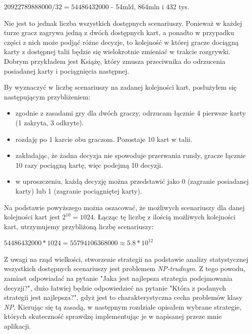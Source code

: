 \begin{center}
	$20 922 789 888 000 / 32 = 54486432000$ - 54mld, 864mln i 432 tys.
\end{center}

Nie jest to jednak liczba wszystkich dostępnych scenariuszy. Ponieważ w każdej turze gracz zagrywa jedną z dwóch dostępnych kart, a ponadto w przypadku części z nich może podjąć różne decyzje, to kolejność w której gracze dociągną karty z dostępnej talii będzie się wielokrotnie zmieniać w trakcie rozgrywki. Dobrym przykładem jest Książę, który zmusza przeciwnika do odrzucenia posiadanej karty i pociągnięcia następnej. 

By wyznaczyć w liczbę scenariuszy na zadanej kolejności kart, posłużyłem się następującym przybliżeniem:
\begin{itemize}
	\item zgodnie z zasadami gry dla dwóch graczy, odrzucam łącznie 4 pierwsze karty (1 zakryta, 3 odkryte).
	\item rozdaję po 1 karcie obu graczom. Pozostaje 10 kart w talii.
	\item zakładając, że żadna decyzja nie spowoduje przerwania rundy, gracze łącznie 10 razy pociągną kartę, więc podejmą 10 decyzji.
	\item w uproszczeniu, każdą decyzję można przedstawić jako 0 (zagranie posiadanej karty) lub 1 (zagranie pociągniętej karty).
\end{itemize}
Na podstawie powyższego można oszacować, że możliwych scenariuszy dla danej kolejności kart jest $2^{10}=1024$. Łącząc tę liczbę z ilością możliwych kolejności kart, utrzymujemy przybliżoną liczbę scenariuszy:

\begin{center}
	$54486432000 * 1024 = 55794106368000 \approx  5.8*10^{12}$
\end{center}

Z uwagi na rząd wielkości, stworzenie strategii na podstawie analizy statystycznej wszystkich dostępnych scenariuszy jest problemem \textit{NP-trudnym}. Z tego powodu, zamiast odpowiadać na pytanie "Jaka jest najlepsza strategia podejmowania decyzji?", dużo łatwiej będzie odpowiedzieć na pytanie "Która z podanych strategii jest najlepsza?", gdyż jest to charakterystyczna cecha problemów klasy \textit{NP}. Kierując się tą zasadą, w następnym rozdziale opisałem wybrane strategie, których skuteczność sprawdzę implementując je w napisanej przeze mnie aplikacji.